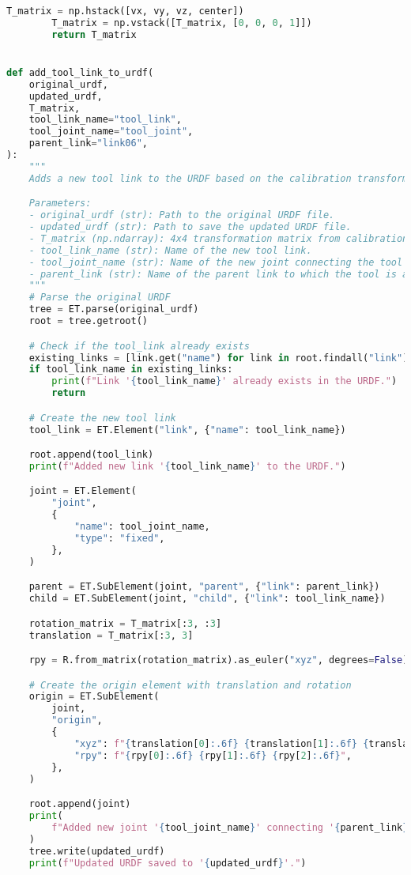 \begin{lstlisting}[language=python, caption=\raggedright{calibration/sensor\_calibration.py}, frame=single]
        T_matrix = np.hstack([vx, vy, vz, center])
        T_matrix = np.vstack([T_matrix, [0, 0, 0, 1]])
        return T_matrix


def add_tool_link_to_urdf(
    original_urdf,
    updated_urdf,
    T_matrix,
    tool_link_name="tool_link",
    tool_joint_name="tool_joint",
    parent_link="link06",
):
    """
    Adds a new tool link to the URDF based on the calibration transformation matrix.

    Parameters:
    - original_urdf (str): Path to the original URDF file.
    - updated_urdf (str): Path to save the updated URDF file.
    - T_matrix (np.ndarray): 4x4 transformation matrix from calibration.
    - tool_link_name (str): Name of the new tool link.
    - tool_joint_name (str): Name of the new joint connecting the tool link.
    - parent_link (str): Name of the parent link to which the tool is attached.
    """
    # Parse the original URDF
    tree = ET.parse(original_urdf)
    root = tree.getroot()

    # Check if the tool_link already exists
    existing_links = [link.get("name") for link in root.findall("link")]
    if tool_link_name in existing_links:
        print(f"Link '{tool_link_name}' already exists in the URDF.")
        return

    # Create the new tool link
    tool_link = ET.Element("link", {"name": tool_link_name})

    root.append(tool_link)
    print(f"Added new link '{tool_link_name}' to the URDF.")

    joint = ET.Element(
        "joint",
        {
            "name": tool_joint_name,
            "type": "fixed",
        },
    )

    parent = ET.SubElement(joint, "parent", {"link": parent_link})
    child = ET.SubElement(joint, "child", {"link": tool_link_name})

    rotation_matrix = T_matrix[:3, :3]
    translation = T_matrix[:3, 3]

    rpy = R.from_matrix(rotation_matrix).as_euler("xyz", degrees=False)

    # Create the origin element with translation and rotation
    origin = ET.SubElement(
        joint,
        "origin",
        {
            "xyz": f"{translation[0]:.6f} {translation[1]:.6f} {translation[2]:.6f}",
            "rpy": f"{rpy[0]:.6f} {rpy[1]:.6f} {rpy[2]:.6f}",
        },
    )

    root.append(joint)
    print(
        f"Added new joint '{tool_joint_name}' connecting '{parent_link}' to '{tool_link_name}'."
    )
    tree.write(updated_urdf)
    print(f"Updated URDF saved to '{updated_urdf}'.")



\end{lstlisting}
